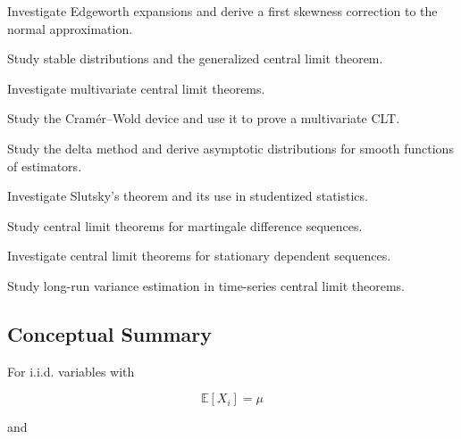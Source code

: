 \begin{exercise}[4]
Investigate Edgeworth expansions and derive a first skewness correction
to the normal approximation.
\end{exercise}

\begin{exercise}[4]
Study stable distributions and the generalized central limit theorem.
\end{exercise}

\begin{exercise}[4]
Investigate multivariate central limit theorems.
\end{exercise}

\begin{exercise}[4]
Study the Cramér--Wold device and use it to prove a multivariate CLT.
\end{exercise}

\begin{exercise}[4]
Study the delta method and derive asymptotic distributions for smooth
functions of estimators.
\end{exercise}

\begin{exercise}[4]
Investigate Slutsky's theorem and its use in studentized statistics.
\end{exercise}

\begin{exercise}[4]
Study central limit theorems for martingale difference sequences.
\end{exercise}

\begin{exercise}[4]
Investigate central limit theorems for stationary dependent sequences.
\end{exercise}

\begin{exercise}[4]
Study long-run variance estimation in time-series central limit
theorems.
\end{exercise}

\subsection{Conceptual Summary}
\label{subsec:clt-summary}

For i.i.d. variables with

\[
\mathbb{E}[X_i]=\mu
\]

and


